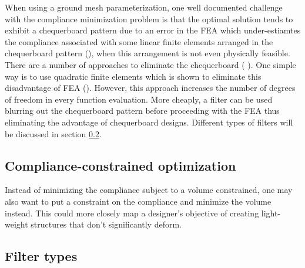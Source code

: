 When using a ground mesh parameterization, one well documented challenge with the compliance minimization problem is that the optimal solution tends to exhibit a chequerboard pattern due to an error in the FEA which under-estiamtes the compliance associated with some linear finite elements arranged in the chequerboard pattern (\cite{Diaz1995}), when this arrangement is not even physically feasible. There are a number of approaches to eliminate the chequerboard ( \cite{Sigmund1998}). One simple way is to use quadratic finite elements which is shown to eliminate this disadvantage of FEA (\cite{Rahmatalla2004}). However, this approach increases the number of degrees of freedom in every function evaluation. More cheaply, a filter can be used blurring out the chequerboard pattern before proceeding with the FEA thus eliminating the advantage of chequerboard designs. Different types of filters will be discussed in section \ref{sec:filter}.

\subsection{Compliance-constrained optimization}

Instead of minimizing the compliance subject to a volume constrained, one may also want to put a constraint on the compliance and minimize the volume instead. This could more closely map a designer's objective of creating light-weight structures that don't significantly deform.

\subsection{Filter types} \label{sec:filter}

